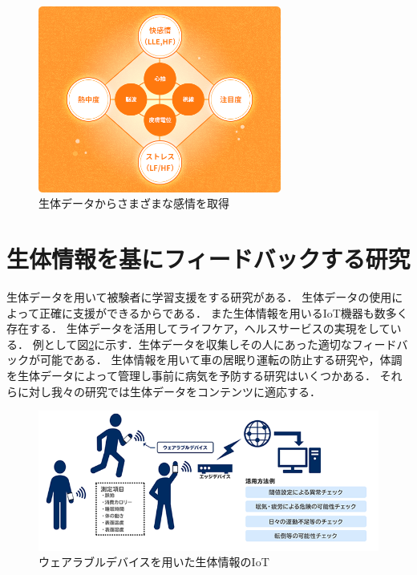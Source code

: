 \begin{figure}[H]
    \centering
    \includegraphics[width=8cm]{images/chapter2/heart.png}
    \caption{生体データからさまざまな感情を取得\cite{kanjoutaiken}}
    \label{seitaidata}
\end{figure}


\section{生体情報を基にフィードバックする研究}

生体データを用いて被験者に学習支援をする研究がある\cite{seitai1,seitai2,seitai3}．
生体データの使用によって正確に支援ができるからである．
また生体情報を用いるIoT機器も数多く存在する．
生体データを活用してライフケア，ヘルスサービスの実現をしている．
例として図\ref{iot}に示す．生体データを収集しその人にあった適切なフィードバックが可能である．
生体情報を用いて車の居眠り運転の防止する研究\cite{unten}や，体調を生体データによって管理し事前に病気を予防する研究\cite{kibun,yobou,yobou2}はいくつかある．
それらに対し我々の研究では生体データをコンテンツに適応する．

\begin{figure}[H]
    \centering
    \includegraphics[width=15cm]{images/chapter2/body_img02.png}
    \caption{ウェアラブルデバイスを用いた生体情報のIoT\cite{nec}}
    \label{iot}
\end{figure}


